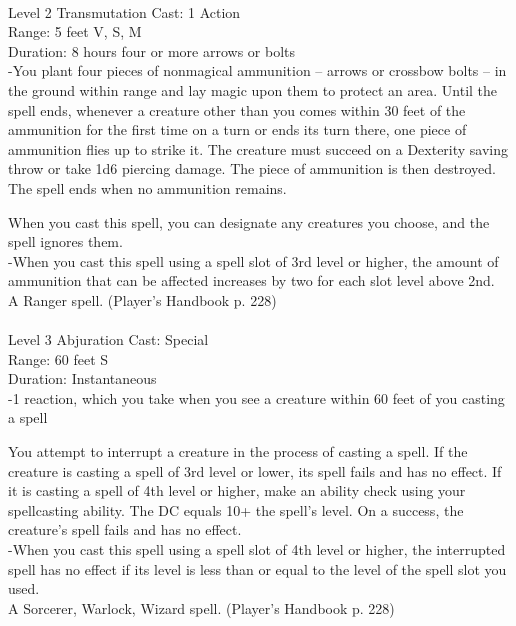 \documentclass[10pt,twocolumn]{report}
\begin{document}
 \\
Level 2 \quad Transmutation \quad Cast: 1 Action\\
Range: 5 feet \quad V, S, M\\
Duration: 8 hours \quad four or more arrows or bolts\\
-You plant four pieces of nonmagical ammunition – arrows or crossbow bolts – in the ground within range and lay magic upon them to protect an area. 
Until the spell ends, whenever a creature other than you comes within 30 feet of the ammunition for the first time on a turn or ends its turn there, one piece of ammunition flies up to strike it. The creature must succeed on a Dexterity saving throw or take 1d6 piercing damage. The piece of ammunition is then destroyed. The spell ends when no ammunition remains. 

When you cast this spell, you can designate any creatures you choose, and the spell ignores them.\\
-When you cast this spell using a spell slot of 3rd level or higher, the amount of ammunition that can be affected increases by two for each slot level above 2nd.\\
A Ranger spell. (Player's Handbook p. 228) \\


 \\
Level 3 \quad Abjuration \quad Cast: Special\\
Range: 60 feet \quad S\\
Duration: Instantaneous \quad \\
-1 reaction, which you take when you see a creature within 60 feet of you casting a spell

You attempt to interrupt a creature in the process of casting a spell. If the creature is casting a spell of 3rd level or lower, its spell fails and has no effect. If it is casting a spell of 4th level or higher, make an ability check using your spellcasting ability.  The DC equals 10+ the spell’s level. On a success, the creature’s spell fails and has no effect.\\
-When you cast this spell using a spell slot of 4th level or higher, the interrupted spell has no effect if its level is less than or equal to the level of the spell slot you used.\\
A Sorcerer, Warlock, Wizard spell. (Player's Handbook p. 228) \\
\end{document}
